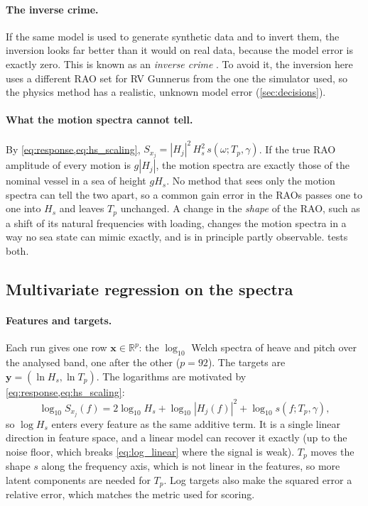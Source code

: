 \documentclass[11pt,a4paper]{article}
\newcommand{\Hs}{H_{s}}
\newcommand{\Tp}{T_{p}}
\newcommand{\vect}[1]{\boldsymbol{#1}}
\begin{document}
\paragraph{The inverse crime.}
If the same model is used to generate synthetic data and to invert them, the inversion looks
far better than it would on real data, because the model error is exactly zero. This is known
as an \emph{inverse crime} \citep{kaipio2005}. To avoid it, the inversion here uses a different
RAO set for RV Gunnerus from the one the simulator used, so the physics method has a realistic,
unknown model error (\cref{sec:decisions}).

\paragraph{What the motion spectra cannot tell.}
By \cref{eq:response,eq:hs_scaling}, $S_{x_j} = |H_j|^2\, \Hs^2\, s(\omega; \Tp, \gamma)$. If the
true RAO amplitude of every motion is $g|H_j|$, the motion spectra are exactly those of the
nominal vessel in a sea of height $g\Hs$. No method that sees only the motion spectra can tell
the two apart, so a common gain error in the RAOs passes one to one into $\Hs$ and leaves $\Tp$
unchanged. A change in the \emph{shape} of the RAO, such as a shift of its natural frequencies
with loading, changes the motion spectra in a way no sea state can mimic exactly, and is in
principle partly observable.  tests both.

\subsection{Multivariate regression on the spectra}
\label{sec:regression}

\paragraph{Features and targets.}
Each run gives one row $\vect x \in \mathbb{R}^p$: the $\log_{10}$ Welch spectra of heave and
pitch over the analysed band, one after the other ($p = 92$). The targets are
$\vect y = (\ln\Hs, \ln\Tp)$. The logarithms are motivated by \cref{eq:response,eq:hs_scaling}:
\begin{equation}
  \log_{10} S_{x_j}(f) = 2\log_{10}\Hs + \log_{10}|H_j(f)|^2 + \log_{10} s(f; \Tp, \gamma),
  \label{eq:log_linear}
\end{equation}
so $\log\Hs$ enters every feature as the same additive term. It is a single linear direction
in feature space, and a linear model can recover it exactly (up to the noise floor, which breaks
\cref{eq:log_linear} where the signal is weak). $\Tp$ moves the shape $s$ along the frequency
axis, which is not linear in the features, so more latent components are needed for $\Tp$.
Log targets also make the squared error a relative error, which matches the metric used for
scoring.
\end{document}
